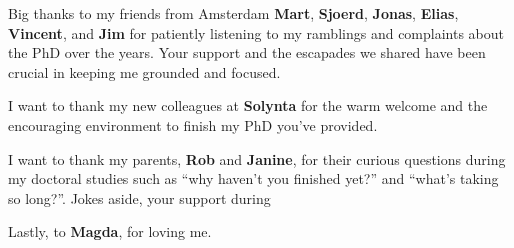 \bigbreak \noindent
Big thanks to my friends from Amsterdam \textbf{Mart}, \textbf{Sjoerd}, \textbf{Jonas}, \textbf{Elias}, \textbf{Vincent}, and \textbf{Jim} for patiently listening to my ramblings and complaints about the PhD over the years. Your support and the escapades we shared have been crucial in keeping me grounded and focused.

\bigbreak \noindent
I want to thank my new colleagues at \textbf{Solynta} for the warm welcome and the encouraging environment to finish my PhD you've provided. 

\bigbreak \noindent
I want to thank my parents, \textbf{Rob} and \textbf{Janine}, for their curious questions during my doctoral studies such as “why haven't you finished yet?” and “what's taking so long?”. Jokes aside, your support during  

\bigbreak \noindent
Lastly, to \textbf{Magda}, for loving me. 

\newpage